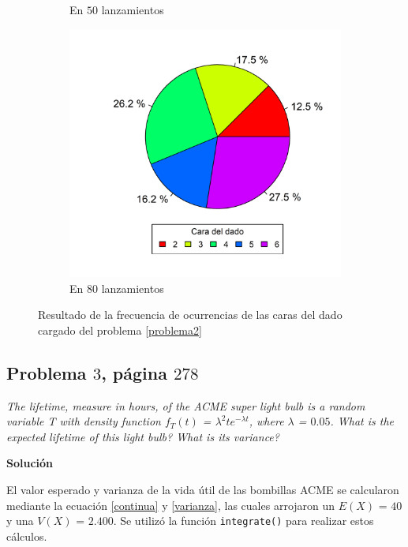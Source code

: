 \documentclass{article}
\begin{document}
\begin{figure}[h]
\begin{center}
\begin{subfigure}{0.32\textwidth}
        \caption{En $50$ lanzamientos}
    \end{subfigure}
    \begin{subfigure}{0.32\textwidth}
        \includegraphics[width=.99\linewidth]{Figures/dados80-.png}
        \caption{En $80$ lanzamientos}
    \end{subfigure}
    \caption{Resultado de la frecuencia de ocurrencias de las caras del dado cargado del problema \ref{problema2}}
    \label{dados1}
    \end{center}
\end{figure}

\subsection{Problema $3$, página $278$} \label{problema3}
\textit{The lifetime, measure in hours, of the ACME super light bulb is a random variable T with density function $f_{T}(t)$ = $\lambda^2 te^{- \lambda t}$, where $\lambda$ = $0.05$. What is the expected lifetime of this light bulb? What is its variance?}

\noindent \textbf{Solución}

El valor esperado y varianza de la vida útil de las bombillas ACME se calcularon mediante la ecuación \ref{continua} y \ref{varianza}, las cuales arrojaron un $E{(X)}$ = $40$ y una $V{(X)}$ = $2.400$. Se utilizó la función \texttt{integrate()} para realizar estos cálculos.
\end{document}
